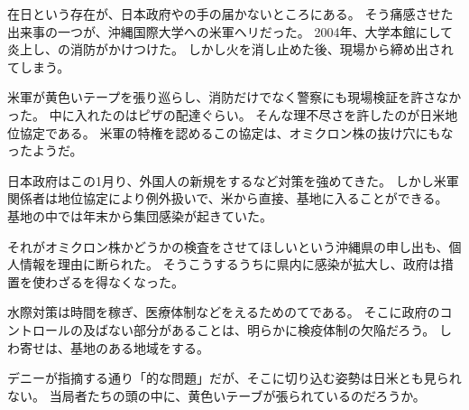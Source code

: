 \documentclass[12pt]{article}
\begin{document}
\begin{CJK}{UTF8}{ipxm}
    在日という存在が、日本政府やの手の届かないところにある。
    そう痛感させた出来事の一つが、沖縄国際大学への米軍ヘリだった。
    2004年、大学本館にして炎上し、の消防がかけつけた。
    しかし火を消し止めた後、現場から締め出されてしまう。

    米軍が黄色いテープを張り巡らし、消防だけでなく警察にも現場検証を許さなかった。
    中に入れたのはピザの配達ぐらい。
    そんな理不尽さを許したのが日米地位協定である。
    米軍の特権を認めるこの協定は、オミクロン株の抜け穴にもなったようだ。

    日本政府はこの1月り、外国人の新規をするなど対策を強めてきた。
    しかし米軍関係者は地位協定により例外扱いで、米から直接、基地に入ることができる。
    基地の中では年末から集団感染が起きていた。
    
    それがオミクロン株かどうかの検査をさせてほしいという沖縄県の申し出も、個人情報を理由に断られた。
    そうこうするうちに県内に感染が拡大し、政府は措置を使わざるを得なくなった。

    水際対策は時間を稼ぎ、医療体制などをえるためのてである。
    そこに政府のコントロールの及ばない部分があることは、明らかに検疫体制の欠陥だろう。
    しわ寄せは、基地のある地域をする。

    デニーが指摘する通り「的な問題」だが、そこに切り込む姿勢は日米とも見られない。
    当局者たちの頭の中に、黄色いテーブが張られているのだろうか。

    

    
\end{CJK}
\end{document}
